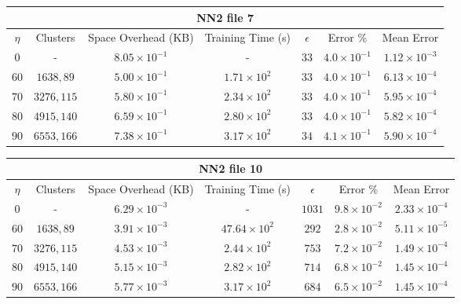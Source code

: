 \par\null\par
\par\null\par

\begin{adjustwidth}{-1cm}{}
\begin{tabular}{ccccccc}
\hline
\multicolumn{7}{c}{NN2 file 7} \\
\toprule
$\eta$ & Clusters & Space Overhead (KB) & Training Time (s) & $\epsilon$ & Error \% & Mean Error\\
\midrule
$0$ & - & $8.05 \times 10^{-1}$ & - & $33$ & $4.0 \times 10^{-1}$ & $1.12 \times 10^{-3}$\\
$60$ & $1638, 89$ & $5.00 \times 10^{-1}$ & $1.71 \times 10^2$ & $33$ & $4.0 \times 10^{-1}$ & $6.13 \times 10^{-4}$\\
$70$ & $3276, 115$ & $5.80 \times 10^{-1}$ & $2.34 \times 10^2$ & $33$ & $4.0 \times 10^{-1}$ & $5.95 \times 10^{-4}$\\
$80$ & $4915, 140$ & $6.59 \times 10^{-1}$ & $2.80 \times 10^2$ & $33$ & $4.0 \times 10^{-1}$ & $5.82 \times 10^{-4}$\\
$90$ & $6553, 166$ & $7.38 \times 10^{-1}$ & $3.17 \times 10^2$ & $34$ & $4.1 \times 10^{-1}$ & $5.90 \times 10^{-4}$\\
\bottomrule
\end{tabular}
\end{adjustwidth}

\par\null\par
\par\null\par

\begin{adjustwidth}{-1cm}{}
\begin{tabular}{ccccccc}
\hline
\multicolumn{7}{c}{NN2 file 10} \\
\toprule
$\eta$ & Clusters & Space Overhead (KB) & Training Time (s) & $\epsilon$ & Error \% & Mean Error\\
\midrule
$0$ & - & $6.29 \times 10^{-3}$ & - & $1031$ & $9.8 \times 10^{-2}$ & $2.33 \times 10^{-4}$\\
$60$ & $1638, 89$ & $3.91 \times 10^{-3}$ & $47.64 \times 10^2$ & $292$ & $2.8 \times 10^{-2}$ & $5.11 \times 10^{-5}$\\
$70$ & $3276, 115$ & $4.53 \times 10^{-3}$ & $2.44 \times 10^2$ & $753$ & $7.2 \times 10^{-2}$ & $1.49 \times 10^{-4}$\\
$80$ & $4915, 140$ & $5.15 \times 10^{-3}$ & $2.82 \times 10^2$ & $714$ & $6.8 \times 10^{-2}$ & $1.45 \times 10^{-4}$\\
$90$ & $6553, 166$ & $5.77 \times 10^{-3}$ & $3.17 \times 10^2$ & $684$ & $6.5 \times 10^{-2}$ & $1.45 \times 10^{-4}$\\
\bottomrule
\end{tabular}
\end{adjustwidth}

